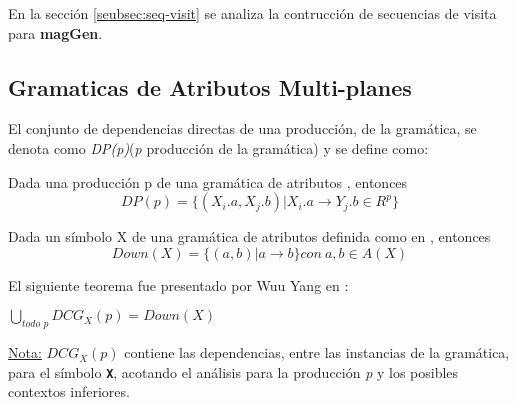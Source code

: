 \documentclass[runningheads,a4paper]{llncs}
\newcommand{\textbtt}[1]{\texttt{\textbf{#1}}}
\newcommand{\maggen}{\textbf{magGen}}
\begin{document}
En la sección \ref{seubsec:seq-visit} se analiza la contrucción de secuencias de visita para \maggen.

% 
% 

\subsection{Gramaticas de Atributos Multi-planes}
\label{def:MAG}

El conjunto de dependencias directas de una producción, de la gramática, se denota como \textit{DP(p)}(\textit{p} producción de la gramática) y se define como:
\begin{definition}
Dada una producción p de una gramática de atributos 
, entonces
\begin{equation}
DP(p) = \{(X_{i}.a, X_{j}.b) | X_{i}.a \rightarrow Y_{j}.b \in R^{p} \}
\end{equation}
\end{definition}


\begin{definition}
Dada un símbolo X de una gramática de atributos definida como en 
, entonces
\begin{equation}
Down(X) = \{(a,b) | a \rightarrow b \} con\ a,b \in A(X)
\end{equation}
\end{definition}

El siguiente teorema fue presentado por Wuu Yang en \cite{wuu-yang1}:
\begin{theorem}
$\bigcup\limits_{\textit{todo p}}{DCG_{X} (p) = Down (X)}$
\end{theorem}
\underline{Nota:} $DCG_{X}(p)$ contiene las dependencias, entre las instancias de la gramática, para el símbolo \textbtt{X}, acotando el análisis para la producción \textit{p} y los posibles contextos inferiores.
\end{document}
